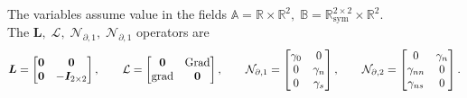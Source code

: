 The variables assume value in the fields $\mathbb{A} = \mathbb{R} \times \mathbb{R}^2, \; \mathbb{B} =\mathbb{R}^{2\times 2}_{\text{sym}} \times \mathbb{R}^2$. \\ The $\bm{L}, \; \mathcal{L}, \; \mathcal{N}_{\partial, 1}, \; \mathcal{N}_{\partial, 1}$ operators are 
\begin{equation}
\bm{L} = \begin{bmatrix}
\bm{0}  & \bm{0}  \\
\bm{0} & -\bm{I}_{2 \times 2} \\
\end{bmatrix}, \qquad
\mathcal{L} = \begin{bmatrix}
\bm{0} & \operatorname*{Grad}\\
\operatorname*{grad} & \bm{0}\\
\end{bmatrix}, \qquad
\mathcal{N}_{\partial, 1} = \begin{bmatrix}
\gamma_0 & 0 \\ 
0 & \gamma_n \\
0 & \gamma_s \\
\end{bmatrix}, \qquad 
\mathcal{N}_{\partial, 2} = \begin{bmatrix}
0 & \gamma_{n}  \\
\gamma_{nn} & 0 \\
\gamma_{ns} & 0\\
\end{bmatrix}.
\end{equation}

